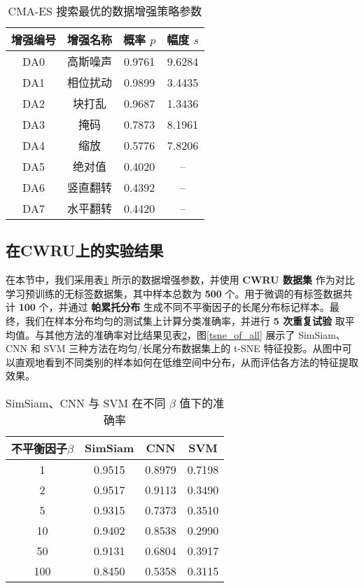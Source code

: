 \documentclass[master]{thesis-uestc}
\begin{document}
\begin{table}[h]
    \caption{CMA-ES 搜索最优的数据增强策略参数}
    \centering
    \begin{tabular}{cccc}
    \toprule
    增强编号 & 增强名称 & 概率 $p$ & 幅度 $s$\\
    \midrule
    DA0 & 高斯噪声 & 0.9761 & 9.6284 \\
    DA1 & 相位扰动 & 0.9899 & 3.4435 \\
    DA2 & 块打乱 & 0.9687 & 1.3436 \\
    DA3 & 掩码 & 0.7873 & 8.1961 \\
    DA4 & 缩放 & 0.5776 & 7.8206 \\
    DA5 & 绝对值 & 0.4020 & -- \\
    DA6 & 竖直翻转 & 0.4392 & -- \\
    DA7 & 水平翻转 & 0.4420 & -- \\
    \bottomrule
    \end{tabular}
    \label{CMA-ES_solution}
\end{table}

\subsection{在CWRU上的实验结果}
\label{simsiam_cwru_results}
在本节中，我们采用表\ref{CMA-ES_solution} 所示的数据增强参数，并使用 \textbf{CWRU 数据集} 作为对比学习预训练的无标签数据集，其中样本总数为 \textbf{500} 个。用于微调的有标签数据共计 \textbf{100} 个，并通过 \textbf{帕累托分布} 生成不同不平衡因子的长尾分布标记样本。最终，我们在样本分布均匀的测试集上计算分类准确率，并进行 \textbf{5 次重复试验} 取平均值。与其他方法的准确率对比结果见表\ref{simsiam_cnn_svm_results}，图\ref{tsne_of_all} 展示了 SimSiam、CNN 和 SVM 三种方法在均匀/长尾分布数据集上的 t-SNE 特征投影。从图中可以直观地看到不同类别的样本如何在低维空间中分布，从而评估各方法的特征提取效果。


\begin{table}[h]
    \caption{SimSiam、CNN 与 SVM 在不同 $\beta$ 值下的准确率}
    \centering
    \begin{tabular}{cccc}
    \toprule
    不平衡因子$\beta$  & SimSiam & CNN & SVM \\
    \midrule
    1   & 0.9515  & 0.8979 & 0.7198 \\
    2   & 0.9517  & 0.9113 & 0.3490 \\
    5   & 0.9315  & 0.7373 & 0.3510 \\
    10  & 0.9402  & 0.8538 & 0.2990 \\
    50  & 0.9131  & 0.6804 & 0.3917 \\
    100 & 0.8450  & 0.5358 & 0.3115 \\
    \bottomrule
    \end{tabular}
    \label{simsiam_cnn_svm_results}
\end{table}
\end{document}
